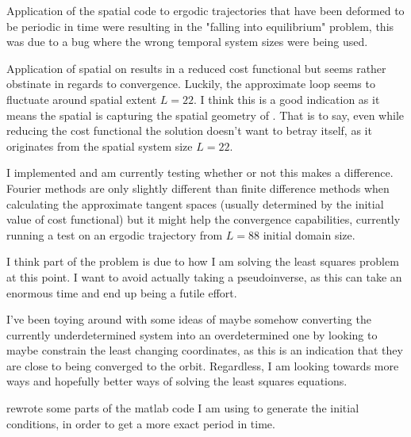 \begin{description}
{\begin{description}
Application of the spatial {\descent} code to ergodic trajectories that have been deformed to
be periodic in time were resulting in the "falling into equilibrium" problem, this was due to a bug
where the wrong temporal system sizes were being used.

Application of spatial {\descent} on  results in a reduced cost
functional but seems rather obstinate in regards to convergence. Luckily, the
approximate loop seems to fluctuate around spatial extent $L=22$. I think this
is a good indication as it means the spatial {\descent} is capturing the
spatial geometry of . That is to say, even while reducing the cost
functional the solution doesn't want to betray itself, as it originates from
the spatial system size $L=22$.

I implemented   and am currently testing whether or not this makes a difference.
Fourier methods are only slightly different than finite difference methods when calculating the
approximate tangent spaces (usually determined by the initial value of cost functional)
but it might help the convergence capabilities, currently running a test on an
ergodic trajectory from $L=88$ initial domain size.

I think part of the problem is due to how I am solving the least squares problem at this point.
I want to avoid actually taking a pseudoinverse, as this can take an enormous time and end up being
a futile effort.

I've been toying around with some ideas of maybe somehow converting the currently underdetermined
system into an overdetermined one by looking to maybe constrain the least changing coordinates, as
this is an indication that they are close to being converged to the orbit. Regardless, I am looking
towards more ways and hopefully better ways of solving the least squares equations.

\item[initial condition production]
rewrote some parts of the matlab code I am using to generate the initial conditions, in order
to get a more exact period in time.
\end{description}
}

\end{description}
